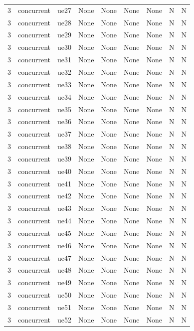 \begin{table}[ht]
\begin{tabular}{|c|c|c|c|c|c|c|c|c|}
3 & concurrent & ue27 & None & None & None & None & N & N \\
3 & concurrent & ue28 & None & None & None & None & N & N \\
3 & concurrent & ue29 & None & None & None & None & N & N \\
3 & concurrent & ue30 & None & None & None & None & N & N \\
3 & concurrent & ue31 & None & None & None & None & N & N \\
3 & concurrent & ue32 & None & None & None & None & N & N \\
3 & concurrent & ue33 & None & None & None & None & N & N \\
3 & concurrent & ue34 & None & None & None & None & N & N \\
3 & concurrent & ue35 & None & None & None & None & N & N \\
3 & concurrent & ue36 & None & None & None & None & N & N \\
3 & concurrent & ue37 & None & None & None & None & N & N \\
3 & concurrent & ue38 & None & None & None & None & N & N \\
3 & concurrent & ue39 & None & None & None & None & N & N \\
3 & concurrent & ue40 & None & None & None & None & N & N \\
3 & concurrent & ue41 & None & None & None & None & N & N \\
3 & concurrent & ue42 & None & None & None & None & N & N \\
3 & concurrent & ue43 & None & None & None & None & N & N \\
3 & concurrent & ue44 & None & None & None & None & N & N \\
3 & concurrent & ue45 & None & None & None & None & N & N \\
3 & concurrent & ue46 & None & None & None & None & N & N \\
3 & concurrent & ue47 & None & None & None & None & N & N \\
3 & concurrent & ue48 & None & None & None & None & N & N \\
3 & concurrent & ue49 & None & None & None & None & N & N \\
3 & concurrent & ue50 & None & None & None & None & N & N \\
3 & concurrent & ue51 & None & None & None & None & N & N \\
3 & concurrent & ue52 & None & None & None & None & N & N \\

\end{tabular}
\end{table}
